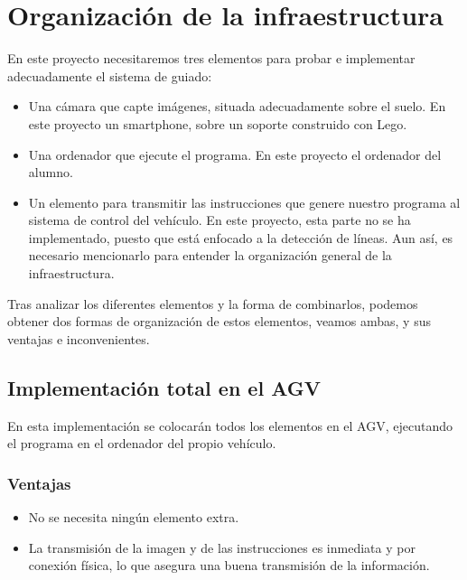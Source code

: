 
\section{Organización de la infraestructura}
En este proyecto necesitaremos tres elementos para probar e implementar adecuadamente el sistema de guiado:

\begin{itemize}
	\item Una cámara que capte imágenes, situada adecuadamente sobre el suelo. En este proyecto un smartphone, sobre un soporte construido con Lego.
	
	\item Una ordenador que ejecute el programa. En este proyecto el ordenador del alumno.
	
	\item Un elemento para transmitir las instrucciones que genere nuestro programa al sistema de control del vehículo. En este proyecto, esta parte no se ha implementado, puesto que está enfocado a la detección de líneas. Aun así, es necesario mencionarlo para entender la organización general de la infraestructura.
	
\end{itemize}

Tras analizar los diferentes elementos y la forma de combinarlos, podemos obtener dos formas de organización de estos elementos, veamos ambas, y sus ventajas e inconvenientes.
 

\subsection{Implementación total en el AGV}


En esta implementación se colocarán todos los elementos en el AGV, ejecutando el programa en el ordenador del propio vehículo.
\subsubsection{Ventajas}
\begin{itemize}

	\item No se necesita ningún elemento extra.
	
	\item La transmisión de la imagen y de las instrucciones es inmediata y por conexión física, lo que asegura una buena transmisión de la información.
	
\end{itemize} 

